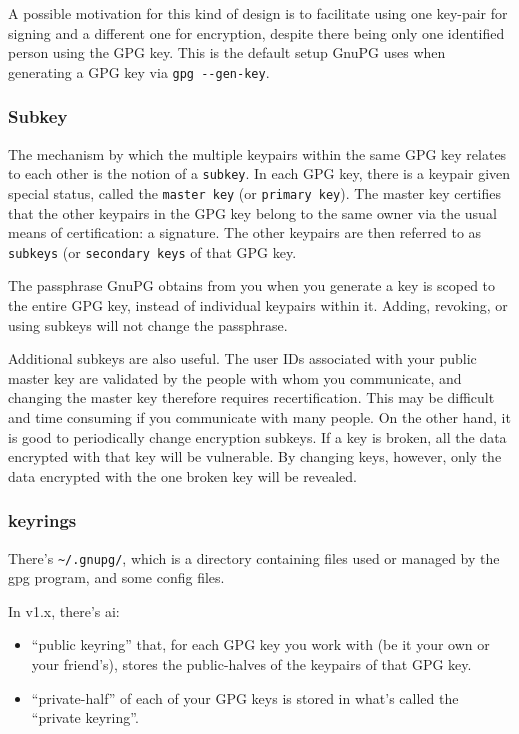 A possible motivation for this kind of design is to facilitate using one
key-pair for signing and a different one for encryption, despite there being
only one identified person using the GPG key. This is the default setup GnuPG
uses when generating a GPG key via \verb+gpg --gen-key+.

\subsubsection{Subkey}
The mechanism by which the multiple keypairs within the same GPG key relates to
each other is the notion of a \verb+subkey+. In each GPG key, there is a
keypair given special status, called the \verb+master key+ 
(or \verb+primary key+). The master key certifies that the other keypairs in
the GPG key belong to the same owner via the usual means of certification: a
signature. The other keypairs are then referred to as \verb+subkeys+ (or
    \verb+secondary keys+ of that GPG key. 

The passphrase GnuPG obtains from you when you generate a key is scoped to the
entire GPG key, instead of individual keypairs within it. Adding, revoking, or
using subkeys will not change the passphrase.

Additional subkeys are also useful. The user IDs associated with your public
master key are validated by the people with whom you communicate, and changing
the master key therefore requires recertification. This may be difficult and
time consuming if you communicate with many people. On the other hand, it is
good to periodically change encryption subkeys. If a key is broken, all the
data encrypted with that key will be vulnerable. By changing keys, however,
only the data encrypted with the one broken key will be revealed.

\subsubsection{keyrings}
There’s \verb+~/.gnupg/+, which is a directory containing files used or managed by the
gpg program, and some config files. 

In v1.x, there’s ai:
\begin{itemize}
    \item “public keyring” that, for each GPG key you work with (be it your own
        or your friend’s), stores the public-halves of the keypairs of that GPG
        key. 
    \item  “private-half” of each of your GPG keys is stored in what’s called
        the “private keyring”.
\end{itemize}

